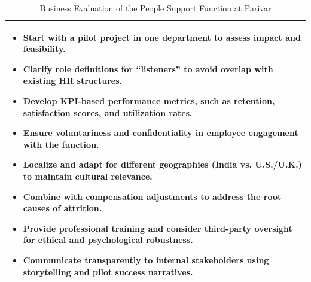 \documentclass[10pt,a4paper]{book}
\begin{document}
\begin{table}[H]
\begin{tabular}{|p{4.2cm}|p{6cm}|p{6cm}|}
\multicolumn{3}{|p{15.2cm}|}{
\begin{itemize}[leftmargin=*, itemsep=1pt]
    \item \textbf{Start with a pilot project} in one department to assess impact and feasibility.
    \item \textbf{Clarify role definitions} for “listeners” to avoid overlap with existing HR structures.
    \item \textbf{Develop KPI-based performance metrics}, such as retention, satisfaction scores, and utilization rates.
    \item \textbf{Ensure voluntariness and confidentiality} in employee engagement with the function.
    \item \textbf{Localize and adapt} for different geographies (India vs. U.S./U.K.) to maintain cultural relevance.
    \item \textbf{Combine with compensation adjustments} to address the root causes of attrition.
    \item \textbf{Provide professional training} and consider third-party oversight for ethical and psychological robustness.
    \item \textbf{Communicate transparently} to internal stakeholders using storytelling and pilot success narratives.
\end{itemize}
} \\
\hline
\end{tabular}
\caption{Business Evaluation of the People Support Function at Parivar}
\end{table}




\clearpage

\end{document}
